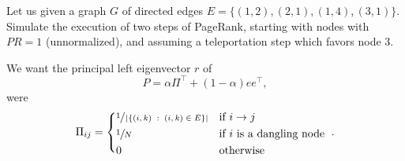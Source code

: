 \exercise

Let us given a graph $G$ of directed edges $E=\{(1,2), (2,1), (1,4), (3,1)\}$.
Simulate the execution of two steps of PageRank, starting with nodes with $PR=1$
(unnormalized), and assuming a teleportation step which favors node 3.

\solution

We want the principal left eigenvector $r$ of
%
$$P = \alpha\Pi^\top + (1-\alpha) ee^\top,$$
%
were
%
\begin{equation*}
  \Pi_{ij} =
  \begin{cases*}
    \sfrac{1}{\left|\left\{(i,k)\;:\;(i,k)\in E\right\}\right|} & if $i \to j$ \\
    \sfrac{1}{N} & if $i$ is a dangling node \\
    0 & otherwise
  \end{cases*}.
\end{equation*}

